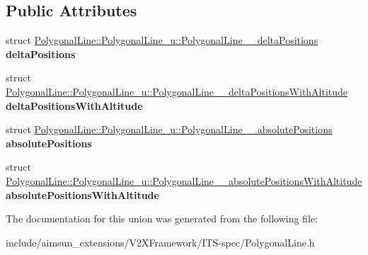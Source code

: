 \subsection*{Public Attributes}
\begin{DoxyCompactItemize}
\item 
struct \hyperlink{structPolygonalLine_1_1PolygonalLine__u_1_1PolygonalLine____deltaPositions}{Polygonal\+Line\+::\+Polygonal\+Line\+\_\+u\+::\+Polygonal\+Line\+\_\+\+\_\+delta\+Positions} {\bfseries delta\+Positions}\hypertarget{unionPolygonalLine_1_1PolygonalLine__u_aaeeeb9a0ee6c1f28a0de1de9902a5e57}{}\label{unionPolygonalLine_1_1PolygonalLine__u_aaeeeb9a0ee6c1f28a0de1de9902a5e57}

\item 
struct \hyperlink{structPolygonalLine_1_1PolygonalLine__u_1_1PolygonalLine____deltaPositionsWithAltitude}{Polygonal\+Line\+::\+Polygonal\+Line\+\_\+u\+::\+Polygonal\+Line\+\_\+\+\_\+delta\+Positions\+With\+Altitude} {\bfseries delta\+Positions\+With\+Altitude}\hypertarget{unionPolygonalLine_1_1PolygonalLine__u_a7d6ed838750288547bbe13d7888384a4}{}\label{unionPolygonalLine_1_1PolygonalLine__u_a7d6ed838750288547bbe13d7888384a4}

\item 
struct \hyperlink{structPolygonalLine_1_1PolygonalLine__u_1_1PolygonalLine____absolutePositions}{Polygonal\+Line\+::\+Polygonal\+Line\+\_\+u\+::\+Polygonal\+Line\+\_\+\+\_\+absolute\+Positions} {\bfseries absolute\+Positions}\hypertarget{unionPolygonalLine_1_1PolygonalLine__u_a7086c3fec8065589daa12599482032d2}{}\label{unionPolygonalLine_1_1PolygonalLine__u_a7086c3fec8065589daa12599482032d2}

\item 
struct \hyperlink{structPolygonalLine_1_1PolygonalLine__u_1_1PolygonalLine____absolutePositionsWithAltitude}{Polygonal\+Line\+::\+Polygonal\+Line\+\_\+u\+::\+Polygonal\+Line\+\_\+\+\_\+absolute\+Positions\+With\+Altitude} {\bfseries absolute\+Positions\+With\+Altitude}\hypertarget{unionPolygonalLine_1_1PolygonalLine__u_ab021f295d576d27097ce71b18a553187}{}\label{unionPolygonalLine_1_1PolygonalLine__u_ab021f295d576d27097ce71b18a553187}

\end{DoxyCompactItemize}


The documentation for this union was generated from the following file\+:\begin{DoxyCompactItemize}
\item 
include/aimsun\+\_\+extensions/\+V2\+X\+Framework/\+I\+T\+S-\/spec/Polygonal\+Line.\+h\end{DoxyCompactItemize}

